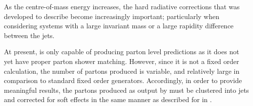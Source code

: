 As the centre-of-mass energy increases, the hard radiative corrections that \HEJ was developed to describe become increasingly important; particularly when considering \dijet systems with a large invariant mass or a large rapidity difference between the jets.

At present, \HEJ is only capable of producing parton level predictions as it does not yet have proper parton shower matching. However, since it is not a
fixed order calculation, the number of partons produced is variable, and relatively large in comparison to standard fixed order generators.
Accordingly, in order to provide meaningful results, the partons produced as output by \HEJ must be clustered into jets and corrected for soft effects in the same manner as described for \NLOjetpp in .

